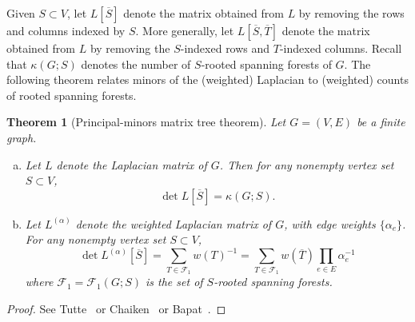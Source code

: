 \documentclass{amsart}
\newtheorem{thm}{Theorem}[section]
\theoremstyle{definition}
\newtheorem{dfn}[thm]{Definition}
\newcommand{\RR}{\mathbb{R}}
\newcommand{\La}{L^{(\alpha)}}
\newcommand{\trees}{\mathcal{F}_1}
\begin{document}

Given $S \subset V$,
let $L[\overline S]$ denote the matrix obtained from $L$ by removing the rows and columns indexed by $S$.
More generally, let $L[\overline S, \overline T]$ denote the matrix obtained from $L$ by removing the $S$-indexed rows and $T$-indexed columns.
Recall that $\kappa(G; S)$ denotes the number of $S$-rooted spanning forests of $G$.
The following theorem relates minors of the (weighted) Laplacian to (weighted) counts of rooted spanning forests.
\begin{thm}[Principal-minors matrix tree theorem]
\label{thm:matrix-tree}
Let $G = (V,E)$ be a finite graph.
\begin{enumerate}[(a)]
\item 
Let $L$ denote the Laplacian matrix of $G$.
Then for any nonempty vertex set $S \subset V$,
\begin{equation}
	\det L[\overline S] = \kappa( G ; S) .
\end{equation}

\item 
Let $\La$ denote the weighted Laplacian matrix of $G$, with edge weights $\{\alpha_e\}$. 
For any nonempty vertex set $S \subset V$,
\begin{equation}
	\det \La[\overline S] = \sum_{T \in \trees} w(T)^{-1}
	= \sum_{T \in \trees} w(\overline{T}) \prod_{e \in E} \alpha_e^{-1}
\end{equation}
where $\trees = \trees(G; S)$ is the set of $S$-rooted spanning forests.
\end{enumerate}
\end{thm}
\begin{proof}
See Tutte~\cite[Section VI.6, Equation (VI.6.7)]{tutte} or Chaiken~\cite{chaiken} or Bapat~\cite[Theorem 4.7]{bapat}.
\end{proof}
\end{document}
